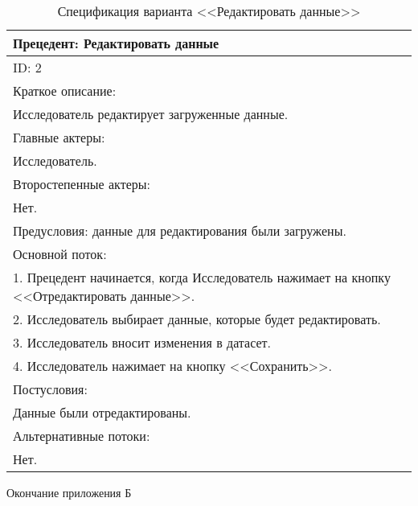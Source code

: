 \begin{table}[H]
    \caption{Спецификация варианта <<Редактировать данные>>}
    \vspace{1em}
    \small
    \begin{tabular}{|p{15cm}|}
       \hline
        Прецедент: Редактировать данные\\ \hline
        ID: 2\\ \hline
        Краткое описание: \\ Исследователь редактирует загруженные данные.\\ \hline
        Главные актеры: \\ Исследователь.\\ \hline
        Второстепенные актеры: \\ Нет.\\ \hline
        Предусловия: данные для редактирования были загружены.\\ \hline
        Основной поток:\\
        1. Прецедент начинается, когда Исследователь нажимает на кнопку <<Отредактировать данные>>.\\
        2. Исследователь выбирает данные, которые будет редактировать.\\
        3. Исследователь вносит изменения в датасет.\\
        4. Исследователь нажимает на кнопку <<Сохранить>>.
        \\ \hline
        Постусловия:\\ Данные были отредактированы. \\ \hline
        Альтернативные потоки:\\ Нет. \\ \hline
    \end{tabular} 
    \label{tab:Razmetka}
\end{table}
\vspace{2em}


\newpage
\begin{flushright}
Окончание приложения Б
\end{flushright}
\vspace{-1.5em}


